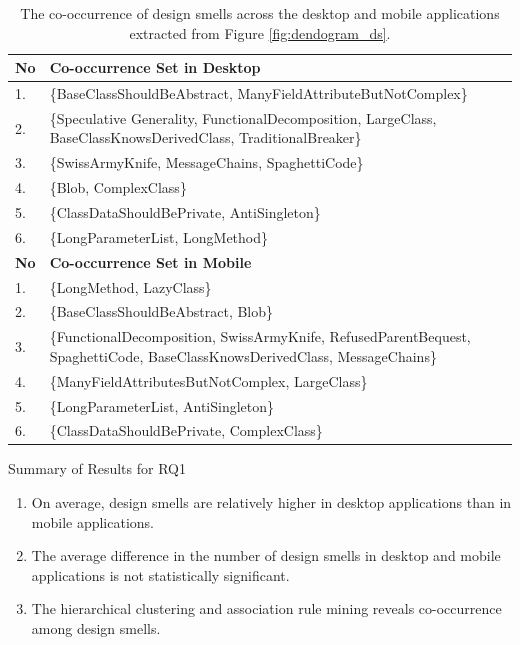 \documentclass[AMA,Times1COL]{WileyNJDv5} %
\begin{document}
	\begin{table}[h!]
	\centering %
	\caption{The co-occurrence of  design smells across the desktop and mobile applications extracted from Figure \ref{fig:dendogram_ds}.} %
	\begin{tabular*}{\textwidth}{@{\extracolsep\fill}ll@{\extracolsep\fill}}%
		
		\toprule
		\textbf{No} & \textbf{Co-occurrence Set in Desktop} \\
		\midrule
		1. & \{BaseClassShouldBeAbstract, ManyFieldAttributeButNotComplex\} \\ 
		2. & \{Speculative Generality, FunctionalDecomposition, LargeClass, BaseClassKnowsDerivedClass, TraditionalBreaker\}  \\ 
		3. &  \{SwissArmyKnife, MessageChains, SpaghettiCode\} \\ 
		4. & \{Blob, ComplexClass\} \\ 
		5. & \{ClassDataShouldBePrivate, AntiSingleton\} \\ 
		6. &  \{LongParameterList, LongMethod\} \\
		\toprule
		\textbf{No} & \textbf{Co-occurrence Set in Mobile}  \\
		\midrule
		1. & \{LongMethod, LazyClass\} \\
		2. & \{BaseClassShouldBeAbstract, Blob\} \\ 
		3. &  \{FunctionalDecomposition, SwissArmyKnife, RefusedParentBequest, SpaghettiCode, BaseClassKnowsDerivedClass, MessageChains\} \\ 
		4. & \{ManyFieldAttributesButNotComplex, LargeClass\} \\ 
		5. & \{LongParameterList, AntiSingleton\} \\ 
		6. &  \{ClassDataShouldBePrivate, ComplexClass\} \\ 
		\bottomrule
	\end{tabular*}
	\label{table:ds_den_table}
\end{table} 
\newpage
	\begin{boxwithhead}
		{Summary of Results for RQ1}
		{\noindent 
			\begin{enumerate}
			\item On average, design smells are relatively higher in desktop applications than in mobile applications. 
			\item The average difference in the number of design smells in desktop and mobile applications is not statistically significant. 
			\item The hierarchical clustering and association rule mining reveals co-occurrence among design smells.
				\end{enumerate}
			}
	\end{boxwithhead}
	
\end{document}
